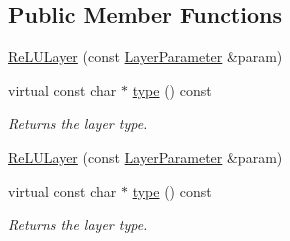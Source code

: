 \subsection*{Public Member Functions}
\begin{DoxyCompactItemize}
\item 
\mbox{\hyperlink{classcaffe_1_1_re_l_u_layer_aa6770fbbfd5e6f564c2ca19de7f7e712}{Re\+L\+U\+Layer}} (const \mbox{\hyperlink{classcaffe_1_1_layer_parameter}{Layer\+Parameter}} \&param)
\item 
\mbox{\label{classcaffe_1_1_re_l_u_layer_ace58f9f5cf8bf4d0b14b24d598914144}} 
virtual const char $\ast$ \mbox{\hyperlink{classcaffe_1_1_re_l_u_layer_ace58f9f5cf8bf4d0b14b24d598914144}{type}} () const
\begin{DoxyCompactList}\small\item\em Returns the layer type. \end{DoxyCompactList}\item 
\mbox{\hyperlink{classcaffe_1_1_re_l_u_layer_aa6770fbbfd5e6f564c2ca19de7f7e712}{Re\+L\+U\+Layer}} (const \mbox{\hyperlink{classcaffe_1_1_layer_parameter}{Layer\+Parameter}} \&param)
\item 
\mbox{\label{classcaffe_1_1_re_l_u_layer_ace58f9f5cf8bf4d0b14b24d598914144}} 
virtual const char $\ast$ \mbox{\hyperlink{classcaffe_1_1_re_l_u_layer_ace58f9f5cf8bf4d0b14b24d598914144}{type}} () const
\begin{DoxyCompactList}\small\item\em Returns the layer type. \end{DoxyCompactList}\end{DoxyCompactItemize}
